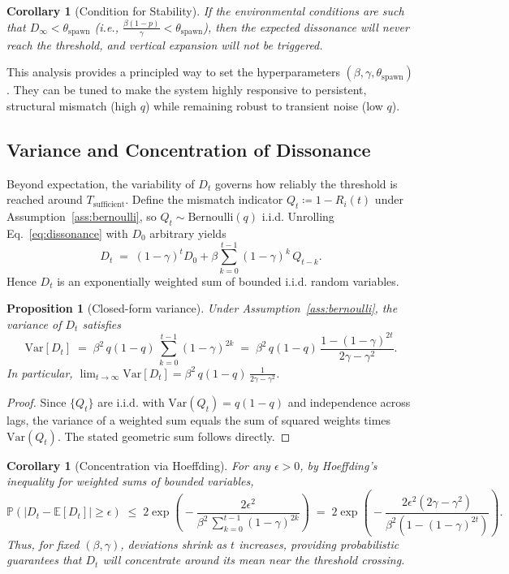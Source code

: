 \documentclass{article}
\newtheorem{proposition}[theorem]{Proposition}
\newtheorem{corollary}[theorem]{Corollary}
\numberwithin{figure}{section}
\numberwithin{table}{section}
\numberwithin{algorithm}{section}
\begin{document}
\begin{corollary}[Condition for Stability]
If the environmental conditions are such that $D_\infty < \theta_{\mathrm{spawn}}$ (i.e., $\frac{\beta(1-p)}{\gamma} < \theta_{\mathrm{spawn}}$), then the expected dissonance will never reach the threshold, and vertical expansion will not be triggered.
\end{corollary}

This analysis provides a principled way to set the hyperparameters $(\beta, \gamma, \theta_{\text{spawn}})$. They can be tuned to make the system highly responsive to persistent, structural mismatch (high $q$) while remaining robust to transient noise (low $q$).

\subsection{Variance and Concentration of Dissonance}
\label{subsec:variance_concentration}
Beyond expectation, the variability of $D_t$ governs how reliably the threshold is reached around $T_{\mathrm{sufficient}}$. Define the mismatch indicator $Q_t \coloneqq 1 - R_i(t)$ under Assumption~\ref{ass:bernoulli}, so $Q_t \sim \text{Bernoulli}(q)$ i.i.d. Unrolling Eq.~\eqref{eq:dissonance} with $D_0$ arbitrary yields
\[
D_t \;=\; (1-\gamma)^t D_0 + \beta \sum_{k=0}^{t-1} (1-\gamma)^k\, Q_{t-k}.
\]
Hence $D_t$ is an exponentially weighted sum of bounded i.i.d. random variables.

\begin{proposition}[Closed-form variance]
\label{prop:variance}
Under Assumption~\ref{ass:bernoulli}, the variance of $D_t$ satisfies
\[
\mathrm{Var}[D_t] \;=\; \beta^2\, q(1-q)\, \sum_{k=0}^{t-1} (1-\gamma)^{2k}
\;=\; \beta^2\, q(1-q)\, \frac{1-(1-\gamma)^{2t}}{2\gamma - \gamma^2}.
\]
In particular, $\lim_{t\to\infty} \mathrm{Var}[D_t] = \beta^2\, q(1-q)\, \frac{1}{2\gamma - \gamma^2}$.
\end{proposition}
\begin{proof}
Since $\{Q_t\}$ are i.i.d. with $\mathrm{Var}(Q_t)=q(1-q)$ and independence across lags, the variance of a weighted sum equals the sum of squared weights times $\mathrm{Var}(Q_t)$. The stated geometric sum follows directly.
\end{proof}

\begin{corollary}[Concentration via Hoeffding]
\label{cor:hoeffding}
For any $\epsilon>0$, by Hoeffding's inequality for weighted sums of bounded variables,
\[
\mathbb{P}\!\left(\left|D_t - \mathbb{E}[D_t]\right| \ge \epsilon \right)
\;\le\; 2\exp\!\left(\!-\frac{2\epsilon^2}{\beta^2\, \sum_{k=0}^{t-1} (1-\gamma)^{2k}}\right)
\;=\; 2\exp\!\left(\!-\frac{2\epsilon^2(2\gamma-\gamma^2)}{\beta^2\left(1-(1-\gamma)^{2t}\right)}\right)\!.
\]
Thus, for fixed $(\beta,\gamma)$, deviations shrink as $t$ increases, providing probabilistic guarantees that $D_t$ will concentrate around its mean near the threshold crossing.
\end{corollary}
\end{document}
